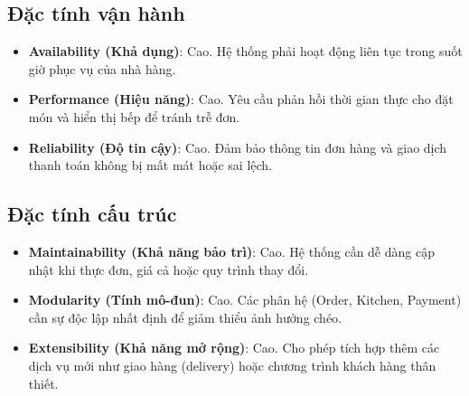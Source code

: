 \subsection{Đặc tính vận hành}
\begin{itemize}
    \item \textbf{Availability (Khả dụng)}: Cao. Hệ thống phải hoạt động liên tục trong suốt giờ phục vụ của nhà hàng.
    \item \textbf{Performance (Hiệu năng)}: Cao. Yêu cầu phản hồi thời gian thực cho đặt món và hiển thị bếp để tránh trễ đơn.
    \item \textbf{Reliability (Độ tin cậy)}: Cao. Đảm bảo thông tin đơn hàng và giao dịch thanh toán không bị mất mát hoặc sai lệch.
\end{itemize}

\subsection{Đặc tính cấu trúc}
\begin{itemize}
    \item \textbf{Maintainability (Khả năng bảo trì)}: Cao. Hệ thống cần dễ dàng cập nhật khi thực đơn, giá cả hoặc quy trình thay đổi.
    \item \textbf{Modularity (Tính mô-đun)}: Cao. Các phân hệ (Order, Kitchen, Payment) cần sự độc lập nhất định để giảm thiểu ảnh hưởng chéo.
    \item \textbf{Extensibility (Khả năng mở rộng)}: Cao. Cho phép tích hợp thêm các dịch vụ mới như giao hàng (delivery) hoặc chương trình khách hàng thân thiết.
\end{itemize}
